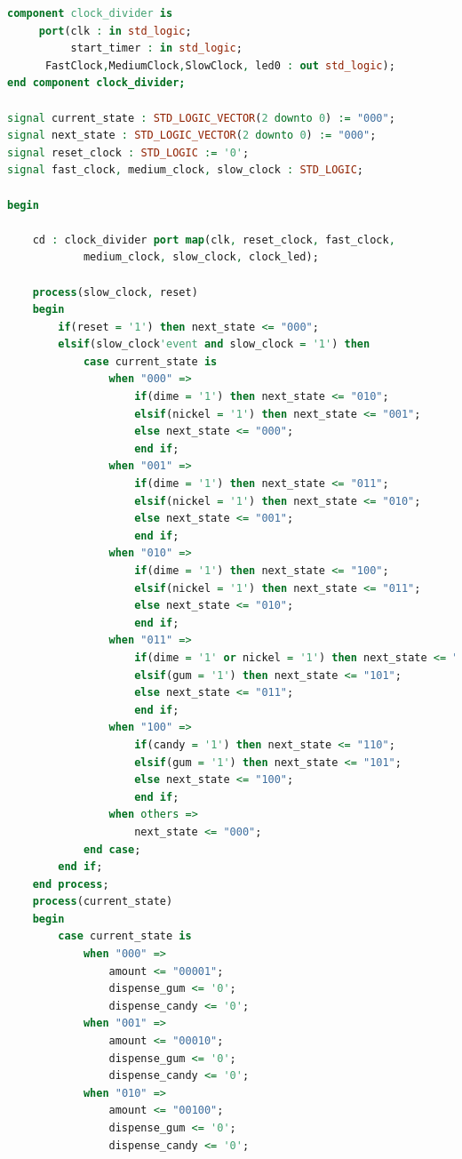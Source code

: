 \documentclass[11pt]{article}
\begin{document}
\begin{appendices}
\begin{lstlisting}[language=VHDL]
component clock_divider is
     port(clk : in std_logic;
          start_timer : in std_logic;
	  FastClock,MediumClock,SlowClock, led0 : out std_logic);
end component clock_divider;

signal current_state : STD_LOGIC_VECTOR(2 downto 0) := "000";
signal next_state : STD_LOGIC_VECTOR(2 downto 0) := "000";
signal reset_clock : STD_LOGIC := '0';
signal fast_clock, medium_clock, slow_clock : STD_LOGIC;

begin

    cd : clock_divider port map(clk, reset_clock, fast_clock, 
    		medium_clock, slow_clock, clock_led);

    process(slow_clock, reset)
    begin
        if(reset = '1') then next_state <= "000";
        elsif(slow_clock'event and slow_clock = '1') then
            case current_state is
                when "000" =>
                    if(dime = '1') then next_state <= "010";
                    elsif(nickel = '1') then next_state <= "001";
                    else next_state <= "000";
                    end if;
                when "001" =>
                    if(dime = '1') then next_state <= "011";
                    elsif(nickel = '1') then next_state <= "010";
                    else next_state <= "001";
                    end if;
                when "010" =>
                    if(dime = '1') then next_state <= "100";
                    elsif(nickel = '1') then next_state <= "011";
                    else next_state <= "010";
                    end if;
                when "011" =>
                    if(dime = '1' or nickel = '1') then next_state <= "100";
                    elsif(gum = '1') then next_state <= "101";
                    else next_state <= "011";
                    end if;
                when "100" =>
                    if(candy = '1') then next_state <= "110";
                    elsif(gum = '1') then next_state <= "101";
                    else next_state <= "100";
                    end if;
                when others =>
                    next_state <= "000";
            end case;
        end if;
    end process;
    process(current_state)
    begin
        case current_state is
            when "000" =>
                amount <= "00001";
                dispense_gum <= '0';
                dispense_candy <= '0';
            when "001" =>
                amount <= "00010";
                dispense_gum <= '0';
                dispense_candy <= '0';
            when "010" =>
                amount <= "00100";
                dispense_gum <= '0';
                dispense_candy <= '0';

\end{lstlisting}
\end{appendices}
\end{document}
